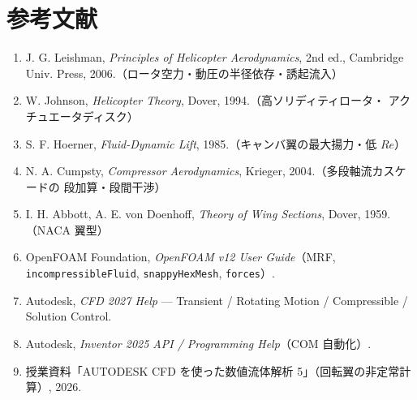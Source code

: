 \documentclass[a4paper,11pt]{jsarticle}
\begin{document}
\section{参考文献}

\begin{enumerate}
  \item J. G. Leishman, \textit{Principles of Helicopter Aerodynamics}, 2nd ed.,
        Cambridge Univ. Press, 2006.（ロータ空力・動圧の半径依存・誘起流入）
  \item W. Johnson, \textit{Helicopter Theory}, Dover, 1994.（高ソリディティロータ・
        アクチュエータディスク）
  \item S. F. Hoerner, \textit{Fluid-Dynamic Lift}, 1985.（キャンバ翼の最大揚力・低 $Re$）
  \item N. A. Cumpsty, \textit{Compressor Aerodynamics}, Krieger, 2004.（多段軸流カスケードの
        段加算・段間干渉）
  \item I. H. Abbott, A. E. von Doenhoff, \textit{Theory of Wing Sections}, Dover, 1959.（NACA 翼型）
  \item OpenFOAM Foundation, \textit{OpenFOAM v12 User Guide}（MRF, \texttt{incompressibleFluid},
        \texttt{snappyHexMesh}, \texttt{forces}）.
  \item Autodesk, \textit{CFD 2027 Help} — Transient / Rotating Motion / Compressible /
        Solution Control.
  \item Autodesk, \textit{Inventor 2025 API / Programming Help}（COM 自動化）.
  \item 授業資料「AUTODESK CFD を使った数値流体解析 5」（回転翼の非定常計算）, 2026.
\end{enumerate}
\end{document}
